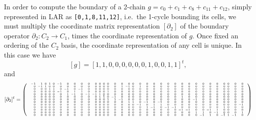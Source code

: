 \begin{example} %
\label{ex:ex1}
In order to compute the boundary of a 2-chain $g = c_0 + c_1 + c_8 + c_{11} +c_{12}$, simply represented in LAR as \texttt{[0,1,8,11,12]}, i.e.~the 1-cycle bounding its cells, we must multiply the coordinate matrix representation  $[\partial_2]$ of the boundary operator $\partial_2: C_2\to C_1$, times the coordinate representation of $g$. Once fixed an ordering of the $C_2$ basis, the coordinate representation of any cell is unique. In this case we have
\[
[g] = [1,1,0,0,0,0,0,0,1,0,0,1,1]^t,
\]
and
\[
[\partial_2]^t = \mat{
{\tiny\arraycolsep=2pt\def\arraystretch{0.8}
\begin{array}
{rrrrrrrrrrrrrrrrrrrrrrrrrrrrrrrrrrrrrrr}
-1 & 1 & 0 & 1 & 0 &-1 & 0 & 0 & 0 & 0 & 0 & 0 & 0 & 0 & 0 & 0 & 0 & 0 & 0 & 0 & 0 & 0 & 0 & 0 & 0 & 0 & 0 & 0 & 0 & 0 & 0 & 0 & 0 & 0\\
 0 &-1 & 1 & 0 & 0 & 0 & 0 & 0 & 0 & 0 & 0 & 0 & 0 & 0 & 0 & 1 &-1 & 0 & 1 & 0 & 0 & 0 & 0 & 0 & 0 & 0 & 0 & 0 & 0 & 0 & 0 & 0 & 0 & 0\\
 0 & 0 & 0 & 1 & 1 & 0 &-1 & 0 &-1 & 0 & 0 & 0 & 0 & 0 & 0 & 0 & 0 & 0 & 0 & 0 & 0 & 0 & 0 & 0 & 0 & 0 & 0 & 0 & 0 & 0 & 0 & 0 & 0 & 0\\
 0 & 0 & 0 & 0 & 0 &-1 & 0 & 1 & 1 & 0 & 0 & 0 & 0 & 1 & 0 & 0 & 0 & 0 & 0 & 0 & 0 & 0 & 0 & 0 & 0 & 0 & 0 & 0 & 0 & 0 & 0 & 0 & 0 & 0\\
 0 & 0 & 0 & 0 & 0 & 0 & 1 &-1 & 0 &-1 &-1 & 1 & 0 & 0 & 0 & 0 & 0 & 0 & 0 & 0 & 0 & 0 & 0 & 0 & 0 & 0 & 0 & 0 & 0 & 0 & 0 & 0 & 0 & 0\\
 0 & 0 & 0 & 0 & 0 & 0 & 0 & 0 & 0 & 0 & 0 & 1 & 1 & 0 &-1 & 0 & 0 & 0 & 0 & 0 & 0 & 0 & 0 & 0 & 1 & 0 & 0 & 0 & 0 & 0 & 0 & 0 & 0 & 0\\
 0 & 0 & 0 & 0 & 0 & 0 & 0 & 0 & 0 & 0 & 0 & 0 & 0 & 1 & 1 &-1 & 0 & 0 & 0 & 0 & 0 & 0 & 0 & 0 & 0 & 0 &-1 & 0 & 0 & 0 & 0 & 0 & 0 & 0\\
 0 & 0 & 0 & 0 & 0 & 0 & 0 & 0 & 0 & 0 & 0 & 0 & 0 & 0 & 0 & 0 & 1 & 1 & 0 &-1 & 0 &-1 & 0 & 0 & 0 & 0 & 0 & 0 & 0 & 0 & 0 & 0 & 0 & 0\\
 0 & 0 & 0 & 0 & 0 & 0 & 0 & 0 & 0 & 0 & 0 & 0 & 0 & 0 & 0 & 0 & 0 & 0 &-1 & 0 & 1 & 1 & 0 & 0 & 0 & 0 & 0 & 0 & 0 & 0 & 0 & 0 & 0 &-1\\
 0 & 0 & 0 & 0 & 0 & 0 & 0 & 0 & 0 & 0 & 0 & 0 & 0 & 0 & 0 & 0 & 0 & 0 & 0 & 1 &-1 & 0 &-1 &-1 & 0 & 0 & 0 & 0 & 0 & 0 & 1 & 0 & 0 & 0\\
 0 & 0 & 0 & 0 & 0 & 0 & 0 & 0 & 0 & 0 & 0 & 0 & 0 & 0 & 0 & 0 & 0 & 0 & 0 & 0 & 0 & 0 & 0 & 0 &-1 &-1 & 0 & 0 &-1 & 1 & 0 & 0 & 0 & 0\\
 0 & 0 & 0 & 0 & 0 & 0 & 0 & 0 & 0 & 0 & 0 & 0 & 0 & 0 & 0 & 0 & 0 & 0 & 0 & 0 & 0 & 0 & 0 & 0 & 0 & 0 & 1 & 1 & 0 &-1 & 0 & 0 & 0 & 1\\
 0 & 0 & 0 & 0 & 0 & 0 & 0 & 0 & 0 & 0 & 0 & 0 & 0 & 0 & 0 & 0 & 0 & 0 & 0 & 0 & 0 & 0 & 0 & 0 & 0 & 0 & 0 &-1 & 1 & 0 &-1 & 1 &-1 & 0\\
\end{array}
}}
\]


\end{example}

